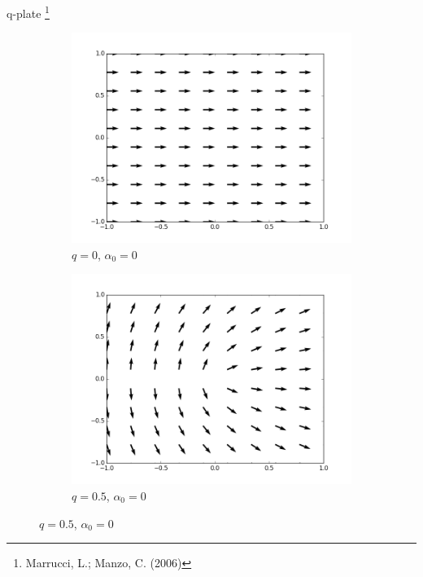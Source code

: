 \documentclass[12pt, dvipsnames]{beamer}
\numberwithin{equation}{section}
\newcommand\blfootnote[1]{%
	\begingroup
	\renewcommand\thefootnote{}\footnote{#1}%
	\addtocounter{footnote}{-1}%
	\endgroup
}
\begin{document}
\begin{frame}[t]{q-plate}\blfootnote{Marrucci, L.; Manzo, C. (2006)}
	\begin{figure}[H]
		\begin{subfigure}[H]{0.35\textwidth}
			\centering
			\includegraphics[width=\textwidth]{qplate(0).png}
			\caption{$q=0$, $\alpha_0=0$}
			\label{fig:q0}
		\end{subfigure}
		\hfil
		\begin{subfigure}[H]{0.35\textwidth}
			\centering
			\includegraphics[width=\textwidth]{qplate(0.5).png}
			\caption{$q=0.5$, $\alpha_0=0$}
			\label{fig:q0.5}
		\end{subfigure}
	\end{figure}

\end{frame}
\end{document}
